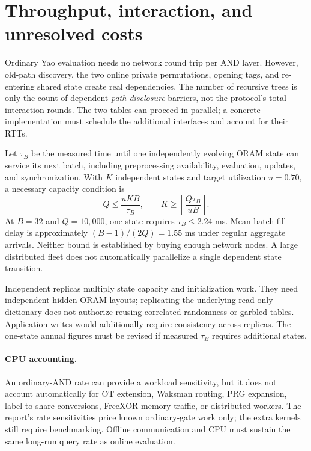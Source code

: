 \documentclass[11pt]{article}
\newcommand{\ceil}[1]{\left\lceil #1\right\rceil}
\begin{document}
\section{Throughput, interaction, and unresolved costs}
\label{sec:limits}
Ordinary Yao evaluation needs no network round trip per AND layer. However,
old-path discovery, the two online private permutations, opening tags, and
re-entering shared state create real dependencies. The number of recursive
trees is only the count of dependent \emph{path-disclosure} barriers, not
the protocol's total interaction rounds. The two tables can proceed in
parallel; a concrete implementation must schedule the additional interfaces
and account for their RTTs.

Let $\tau_B$ be the measured time until one independently evolving ORAM
state can service its next batch, including preprocessing availability,
evaluation, updates, and synchronization. With $K$ independent states and
target utilization $u=0.70$, a necessary capacity condition is
\begin{equation}
 Q\le\frac{uKB}{\tau_B},\qquad
 K\ge\ceil{\frac{Q\tau_B}{uB}}.
\end{equation}
At $B=32$ and $Q=10{,}000$, one state requires $\tau_B\le2.24$ ms.
Mean batch-fill delay is approximately $(B-1)/(2Q)=1.55$ ms under regular
aggregate arrivals. Neither bound is established by buying enough network
nodes. A large distributed fleet does not automatically parallelize a
single dependent state transition.

Independent replicas multiply state capacity and initialization work.
They need independent hidden ORAM layouts; replicating the underlying
read-only dictionary does not authorize reusing correlated randomness or
garbled tables. Application writes would additionally require consistency
across replicas. The one-state annual figures must be revised if measured
$\tau_B$ requires additional states.

\paragraph{CPU accounting.}
An ordinary-AND rate can provide a workload sensitivity, but it does not
account automatically for OT extension, Waksman routing, PRG expansion,
label-to-share conversions, FreeXOR memory traffic, or distributed workers.
The report's rate sensitivities price known ordinary-gate work only; the
extra kernels still require benchmarking. Offline communication and CPU
must sustain the same long-run query rate as online evaluation.
\end{document}
